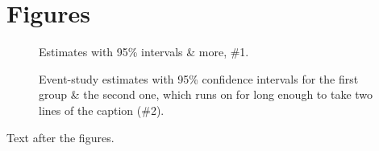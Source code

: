 \documentclass{article}
\begin{document}
\listoffigures
\section{Figures}
\begin{figure}[h]
\centering
\caption{Estimates with 95\% intervals \& more, \#1.}
\end{figure}
\begin{figure}[h]
\centering
\caption{Event-study estimates with 95\% confidence intervals for the first group \& the second one, which runs on for long enough to take two lines of the caption (\#2).}
\end{figure}
Text after the figures.
\end{document}

